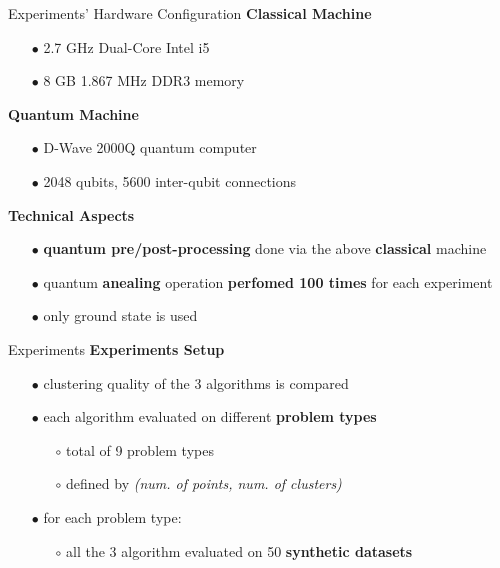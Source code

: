 		\begin{frame}{Experiments' Hardware Configuration}	
			\textbf{Classical Machine}
			\begin{itemize}
				\item[$\bullet$] 2.7 GHz Dual-Core Intel i5 
				\item[$\bullet$] 8 GB 1.867 MHz DDR3 memory 
			\end{itemize}

			\textbf{Quantum Machine}
			\begin{itemize}
				\item[$\bullet$] D-Wave 2000Q quantum computer 
				\item[$\bullet$] 2048 qubits, 5600 inter-qubit connections
			\end{itemize}

			\textbf{Technical Aspects}
			\begin{itemize}
				\item[$\bullet$] \textbf{quantum pre/post-processing} done via the above \textbf{classical} machine
				\item[$\bullet$] quantum \textbf{anealing} operation \textbf{perfomed 100 times} for each experiment   
				\item[$\bullet$] only ground state is used %
			\end{itemize}			


		\end{frame}

		\begin{frame}{Experiments}
			\textbf{Experiments Setup}
			\begin{itemize}
				\item[$\bullet$] clustering quality of the 3 algorithms is compared
				\item[$\bullet$] each algorithm evaluated on different \textbf{problem types}
				\begin{itemize}
					\item[$\circ$] total of 9 problem types 
					\item[$\circ$] defined by \textit{(num. of points, num. of clusters)}
				\end{itemize}
				\item[$\bullet$] for each problem type:
				\begin{itemize}
					\item[$\circ$]  all the 3 algorithm evaluated on 50 \textbf{synthetic datasets}
				\end{itemize}
			\end{itemize}

			
		\end{frame}

